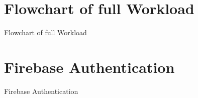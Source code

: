 \begin{figure}[h]
\section{Flowchart of full Workload} 
  \centering
  \caption{Flowchart of full Workload}
  
\end{figure}
\begin{figure}[h]
\section{Firebase Authentication} 
  \centering
  \caption{Firebase Authentication}
  
\end{figure}
